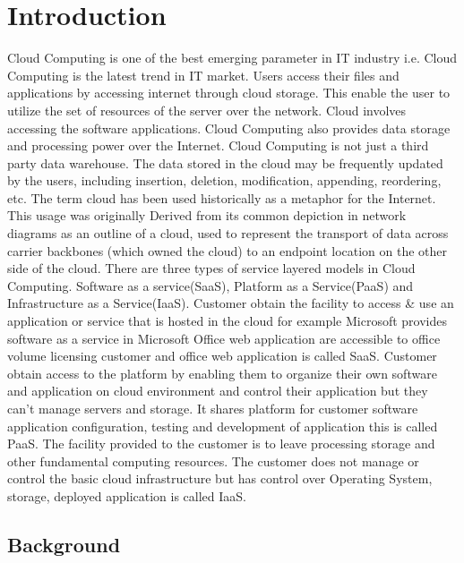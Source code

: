 \section{Introduction}

Cloud Computing is one of the best emerging parameter in IT industry i.e. Cloud Computing is the latest trend in IT market. Users access their files and applications by accessing internet through cloud storage. This enable the user to utilize the set of resources of the server over the network. Cloud involves accessing the software applications. Cloud Computing also provides data storage and processing power over the Internet. Cloud Computing is not just a third party data warehouse. The data stored in the cloud may be frequently updated by the users, including insertion, deletion, modification, appending, reordering, etc.
The term cloud has been used historically as a metaphor for the Internet. This usage was originally Derived from its common depiction in network diagrams as an outline of a cloud, used to represent the transport of data across carrier backbones (which owned the cloud) to an endpoint location on the other side of the cloud.
There are three types of service layered models in Cloud Computing. Software as a service(SaaS), Platform as a Service(PaaS) and Infrastructure as a Service(IaaS). Customer obtain the facility to access & use an application or service that is hosted in the cloud for example Microsoft provides software as a service in Microsoft Office web application are accessible to office volume licensing customer and office web application is called SaaS. Customer obtain access to the platform by enabling them to organize their own software and application on cloud environment and control their application but they can’t manage servers and storage. It shares platform for customer software application configuration, testing and development of application this is called PaaS. The facility provided to the customer is to leave processing storage and other fundamental computing resources. The customer does not manage or control the basic cloud infrastructure but has control over Operating System, storage, deployed application is called IaaS.


\subsection{Background}

